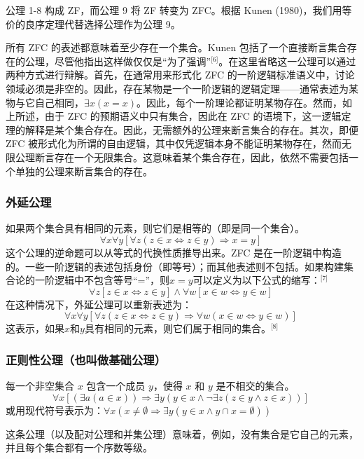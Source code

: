 公理 1-8 构成 ZF，而公理 9 将 ZF 转变为 ZFC。根据 Kunen (1980)，我们用等价的良序定理代替选择公理作为公理 9。

所有 ZFC 的表述都意味着至少存在一个集合。Kunen 包括了一个直接断言集合存在的公理，尽管他指出这样做仅仅是“为了强调”\(^\text{[6]}\)。在这里省略这一公理可以通过两种方式进行辩解。首先，在通常用来形式化 ZFC 的一阶逻辑标准语义中，讨论领域必须是非空的。因此，存在某物是一个一阶逻辑的逻辑定理——通常表述为某物与它自己相同，\(\exists x (x = x)\)。因此，每个一阶理论都证明某物存在。然而，如上所述，由于 ZFC 的预期语义中只有集合，因此在 ZFC 的语境下，这一逻辑定理的解释是某个集合存在。因此，无需额外的公理来断言集合的存在。其次，即便 ZFC 被形式化为所谓的自由逻辑，其中仅凭逻辑本身不能证明某物存在，然而无限公理断言存在一个无限集合。这意味着某个集合存在，因此，依然不需要包括一个单独的公理来断言集合的存在。
\subsubsection{外延公理}  
如果两个集合具有相同的元素，则它们是相等的（即是同一个集合）。
\[
\forall x \forall y \left[ \forall z \left( z \in x \Leftrightarrow z \in y \right) \Rightarrow x = y \right]~
\]
这个公理的逆命题可以从等式的代换性质推导出来。ZFC 是在一阶逻辑中构造的。一些一阶逻辑的表述包括身份（即等号）；而其他表述则不包括。如果构建集合论的一阶逻辑中不包含等号“=”，则\( x = y \)可以定义为以下公式的缩写：\(^\text{[7]}\)
\[
\forall z \left[ z \in x \Leftrightarrow z \in y \right] \land \forall w \left[ x \in w \Leftrightarrow y \in w \right]~
\]
在这种情况下，外延公理可以重新表述为：
\[
\forall x \forall y \left[ \forall z \left( z \in x \Leftrightarrow z \in y \right) \Rightarrow \forall w \left( x \in w \Leftrightarrow y \in w \right) \right]~
\]
这表示，如果\( x \)和\( y \)具有相同的元素，则它们属于相同的集合。\(^\text{[8]}\)
\subsubsection{正则性公理（也叫做基础公理）}
每一个非空集合 \( x \) 包含一个成员 \( y \)，使得 \( x \) 和 \( y \) 是不相交的集合。
\[
\forall x \left[ \left( \exists a \left( a \in x \right) \right) \Rightarrow \exists y \left( y \in x \land \lnot \exists z \left( z \in y \land z \in x \right) \right) \right]~
\]
或用现代符号表示为：\(\forall x \left( x \neq\emptyset \Rightarrow\exists y \left( y \in x \land y \cap x = \emptyset \right) \right)\)

这条公理（以及配对公理和并集公理）意味着，例如，没有集合是它自己的元素，并且每个集合都有一个序数等级。
